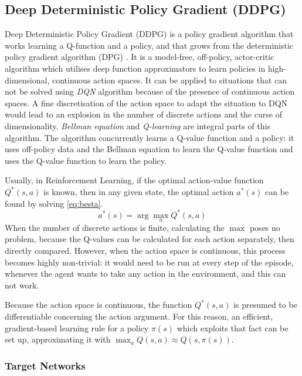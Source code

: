 \subsection{Deep Deterministic Policy Gradient (DDPG)} \label{ddpg}

Deep Deterministic Policy Gradient (DDPG) \cite{lillicrap2015continuous} is a policy gradient algorithm that works learning a Q-function and a policy, and that grows from the deterministic policy gradient algorithm (DPG) \cite{silver2014deterministic}. It is a model-free, off-policy, actor-critic algorithm which utilises deep function approximators to learn policies in high-dimensional, continuous action spaces. It can be applied to situations that can not be solved using \textit{DQN} algorithm \cite{mnih2015human} because of the presence of continuous action spaces. A fine discretisation of the action space to adapt the situation to DQN would lead to an explosion in the number of discrete actions and the curse of dimensionality.
\textit{Bellman equation} and \textit{Q-learning} are integral parts of this algorithm. The algorithm concurrently learns a Q-value function and a policy: it uses off-policy data and the Bellman equation to learn the Q-value function and uses the Q-value function to learn the policy.

Usually, in Reinforcement Learning, if the optimal action-value function $Q^*(s,a)$ is known, then in any given state, the optimal action $a^*(s)$ can be found by solving \vref{eq:besta}.
\begin{equation} \label{eq:besta}
	a^*(s) = \arg \max_a Q^*(s,a)
\end{equation}
When the number of discrete actions is finite, calculating the $\max$ poses no problem, because the Q-values can be calculated for each action separately, then directly compared. However, when the action space is continuous, this process becomes highly non-trivial: it would need to be run at every step of the episode, whenever the agent wants to take any action in the environment, and this can not work.

Because the action space is continuous, the function $Q^*(s,a)$ is presumed to be differentiable concerning the action argument. For this reason, an efficient, gradient-based learning rule for a policy $\pi(s)$ which exploits that fact can be set up, approximating it with $\max_a Q(s,a) \approx Q(s,\pi(s))$.

\subsubsection{Target Networks} \label{targetnet}


